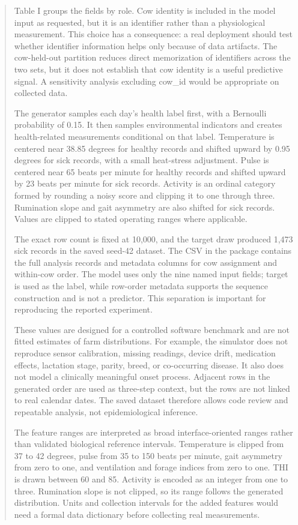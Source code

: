 \documentclass[journal]{IEEEtran}
\begin{document}
\begin{abstract}
Table I groups the fields by role. Cow identity is included in the model input as requested, but it is an identifier rather than a physiological measurement. This choice has a consequence: a real deployment should test whether identifier information helps only because of data artifacts. The cow-held-out partition reduces direct memorization of identifiers across the two sets, but it does not establish that cow identity is a useful predictive signal. A sensitivity analysis excluding cow\_id would be appropriate on collected data.

The generator samples each day's health label first, with a Bernoulli probability of 0.15. It then samples environmental indicators and creates health-related measurements conditional on that label. Temperature is centered near 38.85 degrees for healthy records and shifted upward by 0.95 degrees for sick records, with a small heat-stress adjustment. Pulse is centered near 65 beats per minute for healthy records and shifted upward by 23 beats per minute for sick records. Activity is an ordinal category formed by rounding a noisy score and clipping it to one through three. Rumination slope and gait asymmetry are also shifted for sick records. Values are clipped to stated operating ranges where applicable.

The exact row count is fixed at 10,000, and the target draw produced 1,473 sick records in the saved seed-42 dataset. The CSV in the package contains the full analysis records and metadata columns for cow assignment and within-cow order. The model uses only the nine named input fields; target is used as the label, while row-order metadata supports the sequence construction and is not a predictor. This separation is important for reproducing the reported experiment.

These values are designed for a controlled software benchmark and are not fitted estimates of farm distributions. For example, the simulator does not reproduce sensor calibration, missing readings, device drift, medication effects, lactation stage, parity, breed, or co-occurring disease. It also does not model a clinically meaningful onset process. Adjacent rows in the generated order are used as three-step context, but the rows are not linked to real calendar dates. The saved dataset therefore allows code review and repeatable analysis, not epidemiological inference.

The feature ranges are interpreted as broad interface-oriented ranges rather than validated biological reference intervals. Temperature is clipped from 37 to 42 degrees, pulse from 35 to 150 beats per minute, gait asymmetry from zero to one, and ventilation and forage indices from zero to one. THI is drawn between 60 and 85. Activity is encoded as an integer from one to three. Rumination slope is not clipped, so its range follows the generated distribution. Units and collection intervals for the added features would need a formal data dictionary before collecting real measurements.


\end{abstract}
\end{document}
